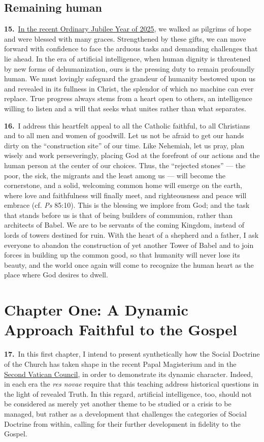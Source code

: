 \documentclass{article}
\begin{document}
\subsection{Remaining human}

\textbf{15.}\ \href{https://www.iubilaeum2025.va/en.html}{In the recent Ordinary Jubilee Year of 2025}, we walked as pilgrims of hope and were blessed with many graces. Strengthened by these gifts, we can move forward with confidence to face the arduous tasks and demanding challenges that lie ahead. In the era of artificial intelligence, when human dignity is threatened by new forms of dehumanization, ours is the pressing duty to remain profoundly human. We must lovingly safeguard the grandeur of humanity bestowed upon us and revealed in its fullness in Christ, the splendor of which no machine can ever replace. True progress always stems from a heart open to others, an intelligence willing to listen and a will that seeks what unites rather than what separates.

\textbf{16.}\ I address this heartfelt appeal to all the Catholic faithful, to all Christians and to all men and women of goodwill. Let us not be afraid to get our hands dirty on the ``construction site'' of our time. Like Nehemiah, let us pray, plan wisely and work perseveringly, placing God at the forefront of our actions and the human person at the center of our choices. Thus, the ``rejected stones'' --- the poor, the sick, the migrants and the least among us --- will become the cornerstone, and a solid, welcoming common home will emerge on the earth, where love and faithfulness will finally meet, and righteousness and peace will embrace (cf. \emph{Ps} 85:10). This is the blessing we implore from God; and the task that stands before us is that of being builders of communion, rather than architects of Babel. We are to be servants of the coming Kingdom, instead of lords of towers destined for ruin. With the heart of a shepherd and a father, I ask everyone to abandon the construction of yet another Tower of Babel and to join forces in building up the common good, so that humanity will never lose its beauty, and the world once again will come to recognize the human heart as the place where God desires to dwell.

\section{Chapter One: A Dynamic Approach Faithful to the Gospel}

\textbf{17.}\ In this first chapter, I intend to present synthetically how the Social Doctrine of the Church has taken shape in the recent Papal Magisterium and in the \href{https://www.vatican.va/archive/hist_councils/ii_vatican_council/index.htm}{Second Vatican Council}, in order to demonstrate its dynamic character. Indeed, in each era the \emph{res novae} require that this teaching address historical questions in the light of revealed Truth. In this regard, artificial intelligence, too, should not be considered as merely yet another theme to be studied or a crisis to be managed, but rather as a development that challenges the categories of Social Doctrine from within, calling for their further development in fidelity to the Gospel.
\end{document}
